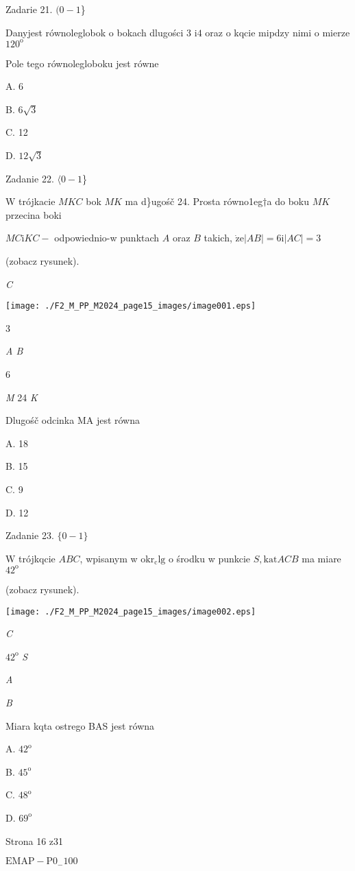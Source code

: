 \documentclass[a4paper,12pt]{article}
\begin{document}
Zadarie 21. $(0-1$\}

Danyjest równoleglobok o bokach dlugości 3 $\mathrm{i} 4$ oraz o kqcie mipdzy nimi o mierze $120^{\mathrm{o}}$

Pole tego równolegloboku jest równe

A. 6

B. $6\sqrt{3}$

C. 12

D. $12\sqrt{3}$

Zadanie 22. $\langle 0-1$\}

$\mathrm{W}$ trójkacie $MKC$ bok $MK$ ma d\}ugośč 24. Prosta równo1eg$\dagger$a do boku $MK$ przecina boki

$MC \mathrm{i} KC -$ odpowiednio-w punktach $A$ oraz $B$ takich, $\dot{\mathrm{z}}\mathrm{e} |AB|=6 \mathrm{i} |AC|=3$

(zobacz rysunek).

{\it C}
\begin{center}
\texttt{[image: ./F2\_M\_PP\_M2024\_page15\_images/image001.eps]}
\end{center}
3

{\it A B}

6

{\it M}  24  {\it K}

Dlugośč odcinka MA jest równa

A. 18

B. 15

C. 9

D. 12

Zadanie 23. $\{0-1\}$

$\mathrm{W}$ trójkqcie $ABC$, wpisanym w $\mathrm{o}\mathrm{k}\mathrm{r}_{\mathrm{c}}\mathrm{l}\mathrm{g}$ o środku w punkcie $S, \mathrm{k}\mathrm{a}\mathrm{t} ACB$ ma miare $42^{\mathrm{o}}$

(zobacz rysunek).
\begin{center}
\texttt{[image: ./F2\_M\_PP\_M2024\_page15\_images/image002.eps]}
\end{center}
{\it C}

$42^{\mathrm{o}}$  {\it S}

{\it A}

{\it B}

Miara kqta ostrego BAS jest równa

A. $42^{\mathrm{o}}$

B. $45^{\mathrm{o}}$

C. $48^{\mathrm{o}}$

D. $69^{\mathrm{o}}$

Strona 16 z31

$\mathrm{E}\mathrm{M}\mathrm{A}\mathrm{P}-\mathrm{P}0_{-}100$
\end{document}
